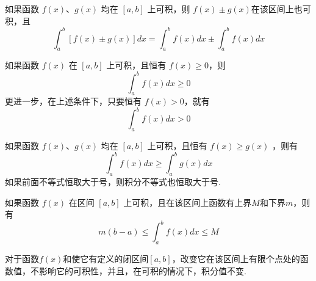 \begin{property}
  如果函数 $f(x)$、$g(x)$ 均在 $[a,b]$ 上可积，则 $f(x)\pm g(x)$在该区间上也可积，且
  \[ \int_a^b [f(x) \pm g(x)] dx =  \int_a^b f(x) dx \pm \int_a^b f(x) dx \]
\end{property}

\begin{property}
  如果函数 $f(x)$ 在 $[a,b]$ 上可积，且恒有 $f(x) \geqslant 0$，则
  \[ \int_a^b f(x) dx \geqslant 0 \]
  更进一步，在上述条件下，只要恒有 $f(x) > 0$，就有
  \[ \int_a^b f(x) dx > 0 \]
\end{property}

\begin{property}
  如果函数 $f(x)$、$g(x)$ 均在 $[a,b]$ 上可积，且恒有 $f(x) \geqslant g(x)$ ，则有
  \[ \int_a^b f(x) dx \geqslant \int_a^{b} g(x) dx \] 
  如果前面不等式恒取大于号，则积分不等式也恒取大于号.
\end{property}

\begin{property}
  如果函数 $f(x)$ 在区间 $[a,b]$ 上可积，且在该区间上函数有上界$M$和下界$m$，则有
  \[ m(b-a) \leqslant \int_a^{b} f(x) dx \leqslant M \]
\end{property}

\begin{property}
  对于函数$f(x)$和使它有定义的闭区间$[a,b]$，改变它在该区间上有限个点处的函数值，不影响它的可积性，并且，在可积的情况下，积分值不变.
\end{property}

